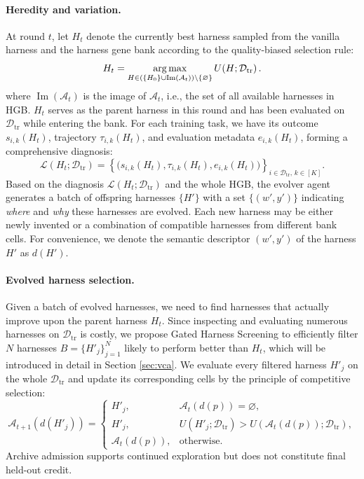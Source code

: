 \paragraph{Heredity and variation.}
At round $t$, let $H_t$ denote the currently best harness sampled from the vanilla harness and the harness gene bank according to the quality-biased selection rule:
%
\begin{equation}
H_t
=
\operatorname*{arg\,max}_{H \in
\left(\{H_0\}\cup\operatorname{Im}(\mathcal{A}_t)\right)
\setminus\{\varnothing\}}
U\!\left(H;\mathcal{D}_{\mathrm{tr}}\right).
\label{eq:bst}
\end{equation}
%
where $\operatorname{Im}(\mathcal{A}_t)$ is the image of $\mathcal{A}_t$, i.e., the set of all available harnesses in HGB.
%
$H_t$ serves as the parent harness in this round and has been evaluated on $\mathcal{D}_{\mathrm{tr}}$ while entering the bank.
%
For each training task, we have its outcome $s_{i,k}(H_t)$, trajectory $\tau_{i,k}(H_t)$, and evaluation metadata $e_{i,k}(H_t)$, forming a comprehensive diagnosis:
%
\begin{equation}
\mathcal{L}(H_t;\mathcal{D}_{\mathrm{tr}})
=
\left\{
\bigl(
s_{i,k}(H_t),
\tau_{i,k}(H_t),
e_{i,k}(H_t)
\bigr)
\right\}_{i\in\mathcal{D}_{\mathrm{tr}},\,k\in[K]}.
\label{eq:diag}
\end{equation}
%
Based on the diagnosis $\mathcal{L}(H_t;\mathcal{D}_{\mathrm{tr}})$ and the whole HGB, the evolver agent generates a batch of offspring harnesses $\{H'\}$ with a set $\{(w',y')\}$ indicating \emph{where} and \emph{why} these harnesses are evolved. Each new harness may be either newly invented or a combination of compatible harnesses from different bank cells.
%
For convenience, we denote the semantic descriptor $(w',y')$ of the harness $H'$ as $d(H')$.

\paragraph{Evolved harness selection.}
Given a batch of evolved harnesses, we need to find harnesses that actually improve upon the parent harness $H_t$.
%
Since inspecting and evaluating numerous harnesses on $\mathcal{D}_{\mathrm{tr}}$ is costly, we propose Gated Harness Screening to efficiently filter $N$ harnesses $B=\{H'_j\}_{j=1}^N$ likely to perform better than $H_t$, which will be introduced in detail in Section \ref{sec:vca}.
%
We evaluate every filtered harness $H'_j$ on the whole $\mathcal{D}_{\mathrm{tr}}$ and update its corresponding cells by the principle of competitive selection:
\begin{equation}
\mathcal{A}_{t+1}(d(H'_j))
=
\begin{cases}
H'_j,
&
\mathcal{A}_{t}(d(p)) = \varnothing,
\\[1.5mm]
H'_j,
&
U(H'_j;\mathcal{D}_{\mathrm{tr}})
>
U(\mathcal{A}_{t}(d(p));\mathcal{D}_{\mathrm{tr}}),
\\[1.5mm]
\mathcal{A}_{t}(d(p)),
&
\text{otherwise}.
\end{cases}
\label{eq:archive-update}
\end{equation}
%
Archive admission supports continued exploration but does not constitute final held-out credit.

